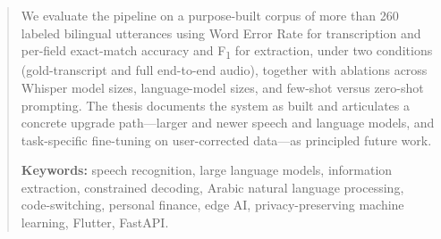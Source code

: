 \begin{abstract}
We evaluate the pipeline on a purpose-built corpus of more than 260 labeled
bilingual utterances using Word Error Rate for transcription and per-field
exact-match accuracy and F\textsubscript{1} for extraction, under two conditions
(gold-transcript and full end-to-end audio), together with ablations across
Whisper model sizes, language-model sizes, and few-shot versus zero-shot
prompting. The thesis documents the system as built and articulates a concrete
upgrade path---larger and newer speech and language models, and task-specific
fine-tuning on user-corrected data---as principled future work.

\vspace{0.4cm}
\noindent\textbf{Keywords:} speech recognition, large language models,
information extraction, constrained decoding, Arabic natural language processing,
code-switching, personal finance, edge AI, privacy-preserving machine learning,
Flutter, FastAPI.
\end{abstract}
